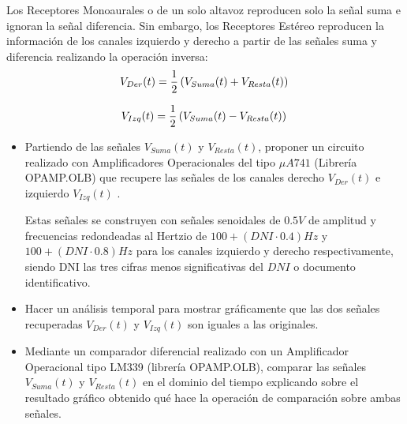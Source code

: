 {Los Receptores Monoaurales o de un solo altavoz reproducen solo la
señal suma e ignoran la señal diferencia. Sin embargo, los Receptores
Estéreo reproducen la información de los canales izquierdo y derecho a
partir de las señales suma y diferencia realizando la operación
inversa:
\begin{equation}
    V_{Der}(t) = \dfrac{1}{2}\left(V_{Suma}(t)+V_{Resta}(t)\right)\\
\label{equa1}
  \end{equation}

  \begin{equation}
        V_{Izq}(t) = \dfrac{1}{2}\left(V_{Suma}(t)-V_{Resta}(t)\right)\\
\label{equa2}
      \end{equation}

\begin{itemize}

\item Partiendo de las señales $V_{Suma}(t)$ y $V_{Resta}(t)$,
proponer un circuito realizado con Amplificadores Operacionales del
tipo $\mu A741$ (Librería OPAMP.OLB) que recupere las señales de los
canales derecho $V_{Der}(t)$ e izquierdo $V_{Izq}(t)$ .

Estas señales se construyen con señales senoidales de $0.5 V$ de
amplitud y frecuencias redondeadas al Hertzio de $100 + (DNI \cdot 0.4)
Hz$ y $100 + (DNI \cdot 0.8) Hz$ para los canales izquierdo y derecho
respectivamente, siendo DNI las tres cifras menos significativas del
$DNI$ o documento identificativo.

\item Hacer un análisis temporal para mostrar gráficamente que las dos
  señales recuperadas $V_{Der}(t)$ y $V_{Izq}(t)$ son iguales a las
  originales.

\item Mediante un comparador diferencial realizado con un Amplificador
  Operacional tipo LM339 (librería OPAMP.OLB), comparar las señales
  $V_{Suma}(t)$ y $V_{Resta}(t)$ en el dominio del tiempo explicando sobre el
  resultado gráfico obtenido qué hace la operación de comparación
  sobre ambas señales. 
\end{itemize}
}
\newpage
